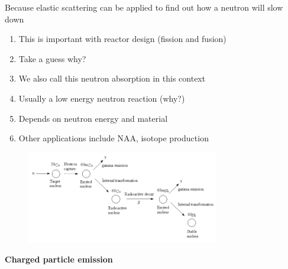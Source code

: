 \documentclass[aspectratio=1610,pdftex,dvipsnames,compress,xcolor={dvipsnames}]{beamer}
\begin{document}
\addtocounter{framenumber}{-1} 
\begin{frame}{Because elastic scattering can be applied to find out how a neutron will slow down}
    \begin{enumerate}[series=outerlist,topsep=0pt,itemsep=21pt,leftmargin=*,label=(\arabic*)]
        \item[]This is important with reactor design (fission and fusion)
        \item[]Take a guess why?
        \item[]We also call this neutron absorption in this context
        \item[]Usually a low energy neutron reaction (why?)
        \item[]Depends on neutron energy and material
        \item[]Other applications include NAA, isotope production
    \end{enumerate}
\end{frame}


\begin{frame}{}
    \begin{figure}
        \centering
        \includegraphics[width=0.75\textwidth]{capture.jpg}
    \end{figure}
\end{frame}


\begin{frame}[plain]{}
    \centering\LARGE\textbf{Charged particle emission}
\end{frame}
\end{document}
